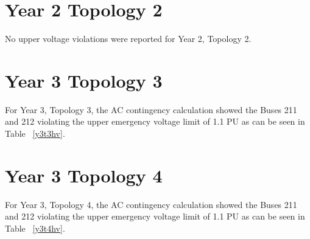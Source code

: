 \documentclass[10pt]{report}
\begin{document}
\begin{table}[H]
\caption{Upper emergency voltage range violation counts - Buses with Contingencies - Year 1, Topology 1}
\label{y1t1hv}
\centering
{}
\end{table}


\section{Year 2 Topology 2}

No upper voltage violations were reported for Year 2, Topology 2.

\section{Year 3 Topology 3}

For Year 3, Topology 3, the AC contingency calculation showed the Buses 211 and 212 violating the upper emergency voltage limit of 1.1 PU as can be seen in Table ~\ref{y3t3hv}.

\begin{table}[H]
\caption{Upper emergency voltage range violation counts - Buses with Contingencies - Year 3, Topology 3}
\label{y3t3hv}
\centering
{}
\end{table}

\section{Year 3 Topology 4}

For Year 3, Topology 4, the AC contingency calculation showed the Buses 211 and 212 violating the upper emergency voltage limit of 1.1 PU as can be seen in Table ~\ref{y3t4hv}. 
\end{document}
